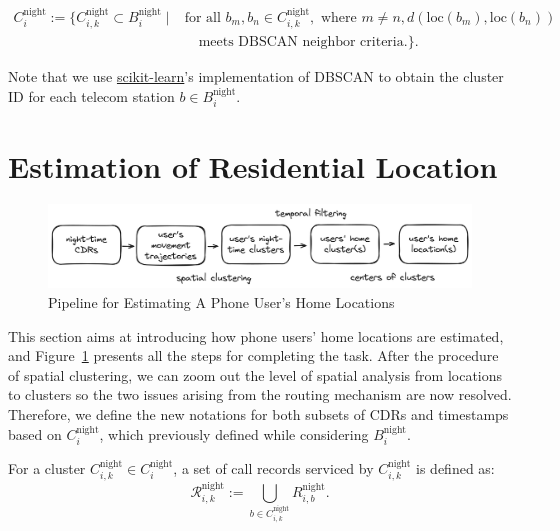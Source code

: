 \begin{definition}
\begin{align*}
C^{\text{night}}_i := \{
    C^{\text{night}}_{i, k} \subset B^{\text{night}}_i
    \mid
    &\text{for all } b_m, b_n \in C^{\text{night}}_{i, k}, \text{ where } m \neq n, d(\text{loc}(b_m), \text{loc}(b_n)) \\
    &\quad \text{meets DBSCAN neighbor criteria.}
\}.
\end{align*}
\end{definition}

Note that we use \href{https://scikit-learn.org/stable/modules/generated/sklearn.cluster.DBSCAN.html}{scikit-learn}'s implementation of DBSCAN to obtain the cluster ID for each telecom station $b \in B^{\text{night}}_{i}$.

\section{Estimation of Residential Location}\label{sec:estimation_of_residential_location}
\begin{figure}[h!]
\centering
\caption{Pipeline for Estimating A Phone User's Home Locations}
\vspace{0.1cm}

\includegraphics[scale=0.088]{figures/pipeline_home_locations.png}


\label{fig:pipeline_home_location}
\end{figure}

This section aims at introducing how phone users' home locations are estimated, and Figure~\ref{fig:pipeline_home_location} presents all the steps for completing the task. After the procedure of spatial clustering, we can zoom out the level of spatial analysis from locations to clusters so the two issues arising from the routing mechanism are now resolved. Therefore, we define the new notations for both subsets of CDRs and timestamps based on $C^\text{night}_i$, which previously defined while considering $B^\text{night}_i$.

\begin{definition}
For a cluster $C^{\text{night}}_{i, k} \in C^{\text{night}}_i$, a set of call records serviced by $C^{\text{night}}_{i, k}$ is defined as:
$$
\mathcal{R}^{\text{night}}_{i, k} := \bigcup_{b \in C^{\text{night}}_{i, k}} R^{\text{night}}_{i, b}.
$$
\end{definition}

